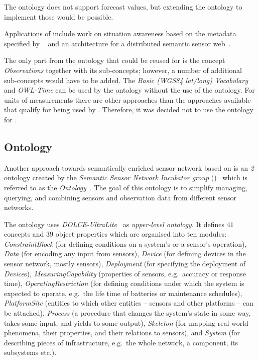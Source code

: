The  ontology does not support forecast values, but extending the  ontology to implement those would be possible.

Applications of  include work on situation awareness based on the metadata specified by ~\cite{ssw_example1} and an architecture for a distributed semantic sensor web~\cite{ssw_example2}.

The only part from the  ontology that could be reused for \smarthomeweather is the concept \emph{Observations} together with its sub-concepts; however, a number of additional sub-concepts would have to be added. The \emph{Basic (WGS84 lat/long) Vocabulary} and \emph{OWL-Time} can be used by the \smarthomeweather ontology without the use of the  ontology. For units of measurements there are other approaches than the  approaches available that qualify for being used by \smarthomeweather. Therefore, it was decided not to use the  ontology for \smarthomeweather.

\vspace{1em}

\subsection{ Ontology}
\label{subsec:onto2}

Another approach towards semantically enriched sensor network based on  is an \emph{ 2} ontology created by the \emph{ Semantic Sensor Network Incubator group} ()~\cite{SSN-XG} which is referred to as the \emph{ Ontology}~\cite{ssn_ontology}. The goal of this ontology is to simplify managing, querying, and combining sensors and observation data from different sensor networks. 

The  ontology uses \emph{DOLCE-UltraLite}~\cite{dul} as \emph{upper-level ontology}. It defines $41$ concepts and $39$ object properties which are organised into ten modules: \emph{ConstraintBlock} (for defining conditions on a system's or a sensor's operation), \emph{Data} (for encoding any input from sensors), \emph{Device} (for defining devices in the sensor network, mostly sensors), \emph{Deployment} (for specifying the deployment of \emph{Device}s), \emph{MeasuringCapability} (properties of sensors, e.g.\ accuracy or response time), \emph{OperatingRestriction} (for defining conditions under which the system is expected to operate, e.g.\ the life time of batteries or maintenance schedules), \emph{PlatformSite} (entities to which other entities -- sensors and other platforms -- can be attached), \emph{Process} (a procedure that changes the system's state in some way, takes some input, and yields to some output), \emph{Skeleton} (for mapping real-world phenomena, their properties, and their relations to sensors), and \emph{System} (for describing pieces of infrastructure, e.g.\ the whole network, a component, its subsystems etc.).

